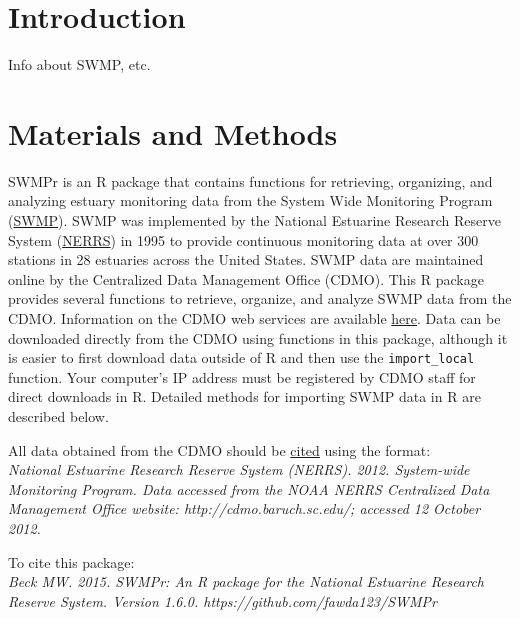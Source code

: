 \documentclass[10pt,letterpaper]{article}\usepackage[]{graphicx}\usepackage[]{color}
\begin{document}
\linenumbers

\section*{Introduction}

Info about SWMP, etc.

\section*{Materials and Methods}

SWMPr is an R package that contains functions for retrieving, organizing, and analyzing estuary monitoring data from the System Wide Monitoring Program (\href{http://nerrs.noaa.gov/RCDefault.aspx?ID=18}{SWMP}).  SWMP was implemented by the National Estuarine Research Reserve System (\href{http://nerrs.noaa.gov/}{NERRS}) in 1995 to provide continuous monitoring data at over 300 stations in 28 estuaries across the United States.  SWMP data are maintained online by the Centralized Data Management Office (CDMO). This R package provides several functions to retrieve, organize, and analyze SWMP data from the CDMO.  Information on the CDMO web services are available \href{http://cdmo.baruch.sc.edu/webservices.cfm}{here}.  Data can be downloaded directly from the CDMO using functions in this package, although it is easier to first download data outside of R and then use the \texttt{import\_local} function.  Your computer's IP address must be registered by CDMO staff for direct downloads in R.  Detailed methods for importing SWMP data in R are described below.  

All data obtained from the CDMO should be \href{http://cdmo.baruch.sc.edu/data/citation.cfm}{cited} using the format: \\

{\it National Estuarine Research Reserve System (NERRS). 2012. System-wide Monitoring Program. Data accessed from the NOAA NERRS Centralized Data Management Office website: http://cdmo.baruch.sc.edu/; accessed 12 October 2012.}

To cite this package: \\

{\it Beck MW. 2015. SWMPr: An R package for the National Estuarine Research Reserve System.  Version 1.6.0. https://github.com/fawda123/SWMPr}
\end{document}
